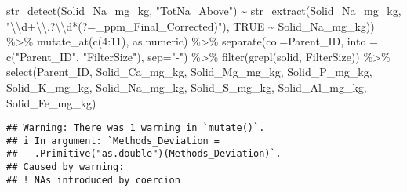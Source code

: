 \documentclass[
]{article}
\newenvironment{Shaded}{\begin{snugshade}}{\end{snugshade}}
\newcommand{\AttributeTok}[1]{\textcolor[rgb]{0.77,0.63,0.00}{#1}}
\newcommand{\ConstantTok}[1]{\textcolor[rgb]{0.00,0.00,0.00}{#1}}
\newcommand{\DecValTok}[1]{\textcolor[rgb]{0.00,0.00,0.81}{#1}}
\newcommand{\FunctionTok}[1]{\textcolor[rgb]{0.00,0.00,0.00}{#1}}
\newcommand{\NormalTok}[1]{#1}
\newcommand{\SpecialCharTok}[1]{\textcolor[rgb]{0.00,0.00,0.00}{#1}}
\newcommand{\StringTok}[1]{\textcolor[rgb]{0.31,0.60,0.02}{#1}}
\begin{document}
\begin{Shaded}
\begin{Highlighting}[]
                \FunctionTok{str\_detect}\NormalTok{(Solid\_Na\_mg\_kg, }\StringTok{"TotNa\_Above"}\NormalTok{) }\SpecialCharTok{\textasciitilde{}} 
                \FunctionTok{str\_extract}\NormalTok{(Solid\_Na\_mg\_kg, }\StringTok{"}\SpecialCharTok{\textbackslash{}\textbackslash{}}\StringTok{d+}\SpecialCharTok{\textbackslash{}\textbackslash{}}\StringTok{.?}\SpecialCharTok{\textbackslash{}\textbackslash{}}\StringTok{d*(?=\_ppm\_Final\_Corrected)"}\NormalTok{),}
                \ConstantTok{TRUE} \SpecialCharTok{\textasciitilde{}}\NormalTok{ Solid\_Na\_mg\_kg)) }\SpecialCharTok{\%\textgreater{}\%}
   \FunctionTok{mutate\_at}\NormalTok{(}\FunctionTok{c}\NormalTok{(}\DecValTok{4}\SpecialCharTok{:}\DecValTok{11}\NormalTok{), as.numeric) }\SpecialCharTok{\%\textgreater{}\%}
  \FunctionTok{separate}\NormalTok{(}\AttributeTok{col=}\NormalTok{Parent\_ID, }\AttributeTok{into =} \FunctionTok{c}\NormalTok{(}\StringTok{"Parent\_ID"}\NormalTok{, }\StringTok{"FilterSize"}\NormalTok{), }\AttributeTok{sep=}\StringTok{"{-}"}\NormalTok{)  }\SpecialCharTok{\%\textgreater{}\%}
  \FunctionTok{filter}\NormalTok{(}\FunctionTok{grepl}\NormalTok{(}\StringTok{\textquotesingle{}solid\textquotesingle{}}\NormalTok{, FilterSize)) }\SpecialCharTok{\%\textgreater{}\%}
  \FunctionTok{select}\NormalTok{(Parent\_ID, Solid\_Ca\_mg\_kg,  Solid\_Mg\_mg\_kg, Solid\_P\_mg\_kg, Solid\_K\_mg\_kg, Solid\_Na\_mg\_kg, Solid\_S\_mg\_kg, Solid\_Al\_mg\_kg, Solid\_Fe\_mg\_kg)}
\end{Highlighting}
\end{Shaded}

\begin{verbatim}
## Warning: There was 1 warning in `mutate()`.
## i In argument: `Methods_Deviation =
##   .Primitive("as.double")(Methods_Deviation)`.
## Caused by warning:
## ! NAs introduced by coercion
\end{verbatim}
\end{document}
